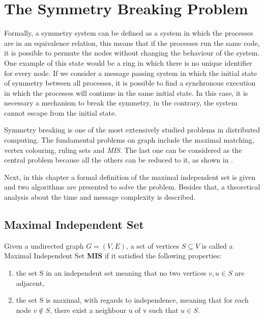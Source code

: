 \section{The Symmetry Breaking Problem}
\label{cap:2}

Formally, a symmetry system can be defined as a system in which the processes are in an equivalence relation, this means that if the processes run the same code, it is possible to permute the nodes without changing the behaviour of the system. One example of this state would be a ring in which there is no unique identifier for every node. If we consider a message passing system in which the initial state of symmetry between all processes, it is possible to find a synchronous execution in which the processes will continue in the same initial state. In this case, it is necessary a mechanism to break the symmetry, in the contrary, the system cannot escape from the initial state.

Symmetry breaking is one of the most extensively studied problems in distributed computing. The fundamental problems on graph include the maximal matching, vertex colouring, ruling sets and \textit{MIS}. The last one can be considered as the central problem because all the others can be reduced to it, as shown in  \cite{}.

Next, in this chapter a formal definition of the maximal independent set is given and two algorithms are presented to solve the problem. Besides that, a theoretical analysis about the time and message complexity is described.     

\subsection{Maximal Independent Set}

\theoremstyle{definition}
\begin{definition}

Given a undirected graph $G = (V,E)$, a set of vertices $S \subseteq V$ is called a Maximal Independent Set \textbf{MIS} if it satisfied the following properties:   

\begin{enumerate}
  \item the set S in an independent set meaning that no two vertices $v,u \in S$ are adjacent,
  \item the set S is maximal, with regards to independence, meaning that for each node $v \notin S$, there 
    exist a neighbour u of v such that $u \in S$.
\end{enumerate}

\end{definition}

